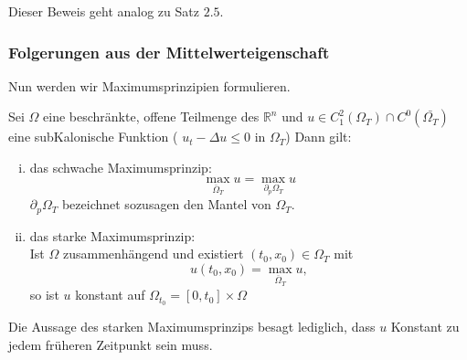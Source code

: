 \begin{beweis}
	Dieser Beweis geht analog zu Satz $2.5$.
\end{beweis}

\subsubsection{Folgerungen aus der Mittelwerteigenschaft} 
\label{sub:folgerungen_aus_der_mittelwerteigenschaft}
Nun werden wir Maximumsprinzipien formulieren.

\begin{satz}[Maximumsprinzipien]
	Sei $\Omega$ eine beschränkte, offene Teilmenge des $\mathbb{R}^n$ und $ u \in C^2_1(\Omega_T) \cap C^0( \bar{\Omega_T})$ eine subKalonische Funktion
	( $ u_t - \Delta u \leq 0$ in $\Omega_T$) Dann gilt:
	\begin{enumerate}[(i)]
		\item das schwache Maximumsprinzip:
		\[
			\max_{\bar{\Omega}_T} u = \max_{\partial_p \Omega_T} u
		\]
		$\partial_p \Omega_T$ bezeichnet sozusagen den Mantel von $\Omega_T$.
		\item das starke Maximumsprinzip: \\
		Ist $\Omega$ zusammenhängend und existiert $(t_0,x_0) \in \Omega_T$ mit 
		\[
			u(t_0,x_0) = \max_{\overline{\Omega}_T}u,
		\]
		so ist $u$ konstant auf $\Omega_{t_0}= [0,t_0] \times \Omega$
	\end{enumerate}
\end{satz}
\begin{bemerkung}
	Die Aussage des starken Maximumsprinzips besagt lediglich, dass $u$ Konstant zu jedem früheren Zeitpunkt sein muss.
\end{bemerkung}

